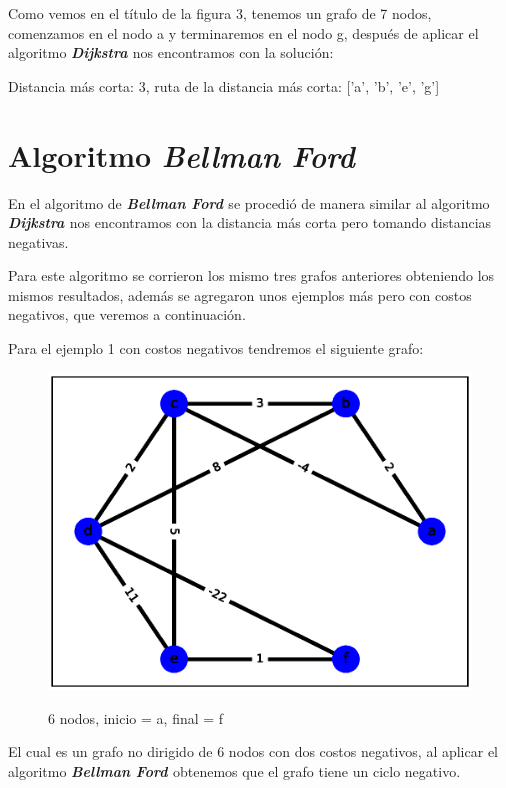\documentclass{report}
\newcommand{\dij}{{\bfseries {\textit{Dijkstra }}}}
\newcommand{\bell}{{\bfseries {\textit{Bellman Ford }}}}
\begin{document}
Como vemos en el título de la  figura 3, tenemos un grafo de 7 nodos, comenzamos en el nodo a y terminaremos en el nodo g, después de aplicar el algoritmo  \dij nos encontramos con la solución:
\begin{center}
    Distancia más corta:
    3,
    ruta de la distancia más corta:
    ['a', 'b', 'e', 'g']
\end{center}

\section{Algoritmo \bell}

En el algoritmo de \bell se procedió de manera similar al algoritmo \dij nos encontramos con la distancia más corta pero tomando distancias negativas.

Para este algoritmo se corrieron los mismo tres grafos anteriores obteniendo los mismos resultados, además se agregaron unos ejemplos más pero con costos negativos, que veremos a continuación.

Para el ejemplo 1 con costos negativos tendremos el siguiente grafo:
\newpage

\begin{figure}[h!t]
    \centering
    \includegraphics[scale = 0.5]{ejemplo4.eps}
    \label{figura4}
    \caption{6 nodos, inicio = a, final = f}
\end{figure}

El cual es un grafo no dirigido de 6 nodos con dos costos negativos, al aplicar el algoritmo \bell obtenemos que el grafo tiene un ciclo negativo.
\end{document}
